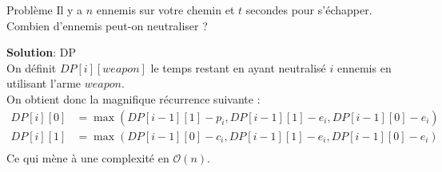 \begin{frame}
    \frametitle{\problemtitle}
        \begin{block}
            {Problème} Il y a $n$ ennemis sur votre chemin et $t$ secondes pour s'échapper. Combien d'ennemis peut-on neutraliser ?
        \end{block}
        \pause
        \textbf{Solution}: DP \\
        \pause
        On définit $DP[i][weapon]$ le temps restant en ayant neutralisé $i$ ennemis en utilisant l'arme $weapon$.\\
        \pause
        On obtient donc la magnifique récurrence suivante :\\
        \begin{align*}
            DP[i][0] &= \max(DP[i-1][1] - p_i, DP[i-1][1] - e_i, DP[i-1][0] - e_i)\\
            DP[i][1] &= \max(DP[i-1][0] - c_i, DP[i-1][1] - e_i, DP[i-1][0] - e_i)\\
        \end{align*}
        Ce qui mène à une complexité en $\mathcal O(n)$.
\end{frame}